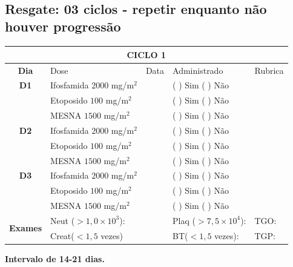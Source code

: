 \documentclass[11pt,a4paper,oldfontcommands]{memoir}
\begin{document}
\hfill  {}\\

\subsection{Resgate: 03 ciclos - repetir enquanto não houver progressão}

\renewcommand{\arraystretch}{1.5}

\begin{center}
\begin{longtable}{p{1cm}p{4cm}|p{1cm}|p{3cm}|p{3cm}}
	\hline
	\multicolumn{5}{c}{\textbf{CICLO 1}}\\
\hline
    \multicolumn{1}{c|}{\multirow{1}{*}{\textbf{Dia}}}&{Dose}&{Data}&{Administrado}&{Rubrica} \\
    \hline
    \multicolumn{1}{c|}{\multirow{1}{*}{\textbf{D1}}}&{Ifosfamida \(2000\) mg/m\(^2\)}&&{(  ) Sim (  ) Não}&\\
    \multicolumn{1}{c|}{\multirow{1}{*}{\textbf{}}}&{Etoposido \(100\) mg/m\(^2\)}&&{(  ) Sim (  ) Não}&\\
    \multicolumn{1}{c|}{\multirow{1}{*}{\textbf{}}}&{MESNA \(1500\) mg/m\(^2\)}&&{(  ) Sim (  ) Não}&\\
    \multicolumn{1}{c|}{\multirow{1}{*}{\textbf{D2}}}&{Ifosfamida \(2000\) mg/m\(^2\)}&&{(  ) Sim (  ) Não}&\\
    \multicolumn{1}{c|}{\multirow{1}{*}{\textbf{}}}&{Etoposido \(100\) mg/m\(^2\)}&&{(  ) Sim (  ) Não}&\\
    \multicolumn{1}{c|}{\multirow{1}{*}{\textbf{}}}&{MESNA \(1500\) mg/m\(^2\)}&&{(  ) Sim (  ) Não}&\\
    \multicolumn{1}{c|}{\multirow{1}{*}{\textbf{D3}}}&{Ifosfamida \(2000\) mg/m\(^2\)}&&{(  ) Sim (  ) Não}&\\
    \multicolumn{1}{c|}{\multirow{1}{*}{\textbf{}}}&{Etoposido \(100\) mg/m\(^2\)}&&{(  ) Sim (  ) Não}&\\
    \multicolumn{1}{c|}{\multirow{1}{*}{\textbf{}}}&{MESNA \(1500\) mg/m\(^2\)}&&{(  ) Sim (  ) Não}&\\

    \hline
    \multicolumn{1}{c|}{\multirow{2}{*}{\textbf{Exames}}}&\multicolumn{2}{l|}{Neut (\(>1,0\times10^3\)):}&{Plaq (\(>7,5\times10^4\)):}&{TGO:}\\
    \cline{2-5}
    \multicolumn{1}{c|}{\multirow{2}{*}{{}}}&\multicolumn{2}{l|}{Creat(\(<1,5\) vezes)}&{BT(\(<1,5\) vezes):}&{TGP:}
    \\
    \hline
\end{longtable}
\textbf{Intervalo de 14-21 dias.}
\end{center}
\end{document}
